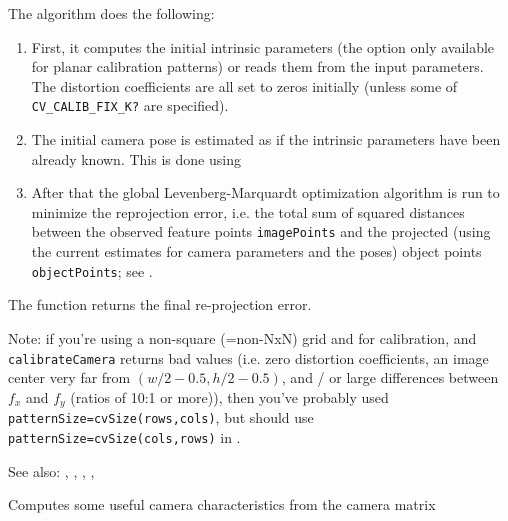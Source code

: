 The algorithm does the following:
\begin{enumerate}
    \item First, it computes the initial intrinsic parameters (the option only available for planar calibration patterns) or reads them from the input parameters. The distortion coefficients are all set to zeros initially (unless some of \texttt{CV\_CALIB\_FIX\_K?} are specified).
    \item The initial camera pose is estimated as if the intrinsic parameters have been already known. This is done using 
    \item After that the global Levenberg-Marquardt optimization algorithm is run to minimize the reprojection error, i.e. the total sum of squared distances between the observed feature points \texttt{imagePoints} and the projected (using the current estimates for camera parameters and the poses) object points \texttt{objectPoints}; see .
\end{enumerate}

\ifPy
\else
The function returns the final re-projection error.
\fi

Note: if you're using a non-square (=non-NxN) grid and
 for calibration, and \texttt{calibrateCamera} returns
bad values (i.e. zero distortion coefficients, an image center very far from
$(w/2-0.5,h/2-0.5)$, and / or large differences between $f_x$ and $f_y$ (ratios of
10:1 or more)), then you've probably used \texttt{patternSize=cvSize(rows,cols)},
but should use \texttt{patternSize=cvSize(cols,rows)} in .

See also: , , , , 

\ifCpp

Computes some useful camera characteristics from the camera matrix

